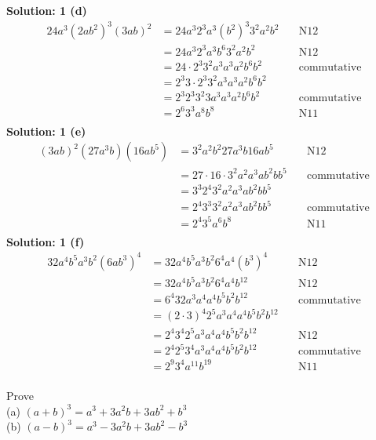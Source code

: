 \textbf{Solution: 1 (d)}
\begin{align*}
24 a^3 {(2 a b^2)}^3 {(3 a b)}^2 &= 24 a^3 2^3 a^3 {(b^2)}^3 3^2 a^2 b^2 & \quad \text{N12} \\
&= 24 a^3 2^3 a^3 b^6 3^2 a^2 b^2 & \quad \text{N12} \\
&= 24 \cdot 2^3 3^2 a^3 a^3 a^2 b^6 b^2 & \quad \text{commutative} \\
&= 2^3 3 \cdot 2^3 3^2 a^3 a^3 a^2 b^6 b^2 & \quad \text{} \\
&= 2^3 2^3 3^2 3 a^3 a^3 a^2 b^6 b^2 & \quad \text{commutative} \\
&= 2^6 3^3 a^8 b^8 & \quad \text{N11} \\
\end{align*}
\textbf{Solution: 1 (e)}
\begin{align*}
{(3 a b)}^2 (27 a^3 b) (16 a b^5) &= 3^2 a^2 b^2 27 a^3 b 16 a b^5 & \quad \text{N12} \\
&= 27 \cdot 16 \cdot 3^2 a^2 a^3 a b^2 b b^5 & \quad \text{commutative} \\
&= 3^3 2^4 3^2 a^2 a^3 a b^2 b b^5 & \quad \text{} \\
&=  2^4 3^3 3^2 a^2 a^3 a b^2 b b^5 & \quad \text{commutative} \\
&=  2^4 3^5 a^6 b^8 & \quad \text{N11} \\
\end{align*}
\textbf{Solution: 1 (f)}
\begin{align*}
32 a^4 b^5 a^3 b^2 {(6 a b^3)}^4 &= 32 a^4 b^5 a^3 b^2 6^4 a^4 {(b^3)}^4 & \quad \text{N12} \\
&= 32 a^4 b^5 a^3 b^2 6^4 a^4 b^{12} & \quad \text{N12} \\
&= 6^4 32 a^3 a^4 a^4 b^5 b^2 b^{12} & \quad \text{commutative} \\
&= {(2 \cdot 3)}^4 2^5 a^3 a^4 a^4 b^5 b^2 b^{12} & \quad \text{} \\
&= 2^4 3^4 2^5 a^3 a^4 a^4 b^5 b^2 b^{12} & \quad \text{N12} \\
&= 2^4 2^5 3^4 a^3 a^4 a^4 b^5 b^2 b^{12} & \quad \text{commutative} \\
&= 2^9 3^4 a^{11} b^{19} & \quad \text{N11} \\
\end{align*}


\begin{tcolorbox}[title=Problem 2, breakable]
Prove \\
(a) ${(a + b)}^3 = a^3 + 3 a^2 b + 3 a b^2 + b^3$ \\
(b) ${(a - b)}^3 = a^3 - 3 a^2 b + 3 a b^2 - b^3$
\end{tcolorbox}

